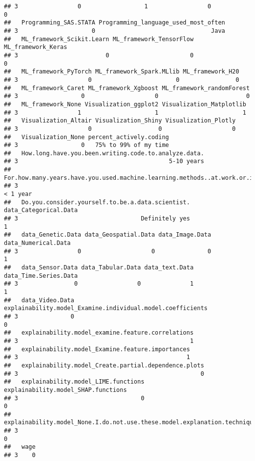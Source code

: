 \documentclass[
]{article}
\begin{document}
\begin{verbatim}
## 3                 0                  1                 0                 0
##   Programming_SAS.STATA Programming_language_used_most_often
## 3                     0                                 Java
##   ML_framework_Scikit.Learn ML_framework_TensorFlow ML_framework_Keras
## 3                         0                       0                  0
##   ML_framework_PyTorch ML_framework_Spark.MLlib ML_framework_H20
## 3                    0                        0                0
##   ML_framework_Caret ML_framework_Xgboost ML_framework_randomForest
## 3                  0                    0                         0
##   ML_framework_None Visualization_ggplot2 Visualization_Matplotlib
## 3                 1                     1                        1
##   Visualization_Altair Visualization_Shiny Visualization_Plotly
## 3                    0                   0                    0
##   Visualization_None percent_actively.coding
## 3                  0   75% to 99% of my time
##   How.long.have.you.been.writing.code.to.analyze.data.
## 3                                           5-10 years
##   For.how.many.years.have.you.used.machine.learning.methods..at.work.or.in.school..
## 3                                                                          < 1 year
##   Do.you.consider.yourself.to.be.a.data.scientist. data_Categorical.Data
## 3                                   Definitely yes                     1
##   data_Genetic.Data data_Geospatial.Data data_Image.Data data_Numerical.Data
## 3                 0                    0               0                   1
##   data_Sensor.Data data_Tabular.Data data_text.Data data_Time.Series.Data
## 3                0                 0              1                     1
##   data_Video.Data explainability.model_Examine.individual.model.coefficients
## 3               0                                                          0
##   explainability.model_examine.feature.correlations
## 3                                                 1
##   explainability.model_Examine.feature.importances
## 3                                                1
##   explainability.model_Create.partial.dependence.plots
## 3                                                    0
##   explainability.model_LIME.functions explainability.model_SHAP.functions
## 3                                   0                                   0
##   explainability.model_None.I.do.not.use.these.model.explanation.techniques
## 3                                                                         0
##   wage
## 3    0
\end{verbatim}
\end{document}
